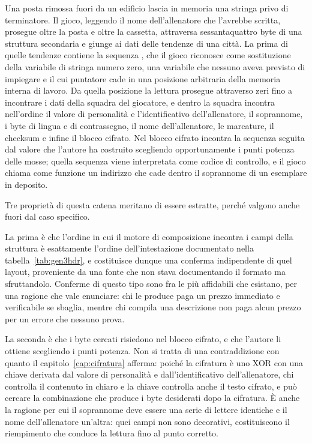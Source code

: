 Una posta rimossa fuori da un edificio lascia in memoria una stringa privo di terminatore. Il gioco, leggendo il nome dell'allenatore che l'avrebbe scritta, prosegue oltre la posta e oltre la cassetta, attraversa sessantaquattro byte di una struttura secondaria e giunge ai dati delle tendenze di una città. La prima di quelle tendenze contiene la sequenza  , che il gioco riconosce come sostituzione della variabile di stringa numero zero, una variabile che nessuno aveva previsto di impiegare e il cui puntatore cade in una posizione arbitraria della memoria interna di lavoro. Da quella posizione la lettura prosegue attraverso zeri fino a incontrare i dati della squadra del giocatore, e dentro la squadra incontra nell'ordine il valore di personalità e l'identificativo dell'allenatore, il soprannome, i byte di lingua e di contrassegno, il nome dell'allenatore, le marcature, il checksum e infine il blocco cifrato. Nel blocco cifrato incontra la sequenza  seguita dal valore che l'autore ha costruito scegliendo opportunamente i punti potenza delle mosse; quella sequenza viene interpretata come codice di controllo, e il gioco chiama come funzione un indirizzo che cade dentro il soprannome di un esemplare in deposito.

Tre proprietà di questa catena meritano di essere estratte, perché valgono anche fuori dal caso specifico.

La prima è che l'ordine in cui il motore di composizione incontra i campi della struttura è esattamente l'ordine dell'intestazione documentato nella tabella~\ref{tab:gen3hdr}, e costituisce dunque una conferma indipendente di quel layout, proveniente da una fonte che non stava documentando il formato ma sfruttandolo. Conferme di questo tipo sono fra le più affidabili che esistano, per una ragione che vale enunciare: chi le produce paga un prezzo immediato e verificabile se sbaglia, mentre chi compila una descrizione non paga alcun prezzo per un errore che nessuno prova.

La seconda è che i byte cercati risiedono nel blocco cifrato, e che l'autore li ottiene scegliendo i punti potenza. Non si tratta di una contraddizione con quanto il capitolo~\ref{cap:cifratura} afferma: poiché la cifratura è uno XOR con una chiave derivata dal valore di personalità e dall'identificativo dell'allenatore, chi controlla il contenuto in chiaro e la chiave controlla anche il testo cifrato, e può cercare la combinazione che produce i byte desiderati dopo la cifratura. È anche la ragione per cui il soprannome deve essere una serie di lettere identiche e il nome dell'allenatore un'altra: quei campi non sono decorativi, costituiscono il riempimento che conduce la lettura fino al punto corretto.

